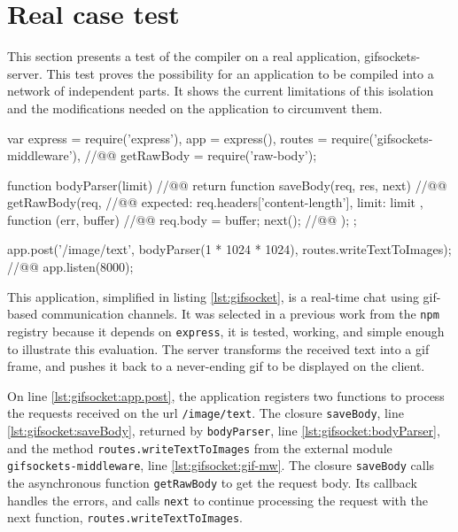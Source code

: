 \section{Real case test} \label{section:evaluation}

This section presents a test of the compiler on a real application, gifsockets-server.
This test proves the possibility for an application to be compiled into a network of independent parts.
It shows the current limitations of this isolation and the modifications needed on the application to circumvent them.

\begin{code}[js, caption={Simplified version of gifsockets-server},label={lst:gifsocket}]
var express = require('express'),
    app = express(),
    routes = require('gifsockets-middleware'), //@\label{lst:gifsocket:gif-mw}@
    getRawBody = require('raw-body');

function bodyParser(limit) { //@\label{lst:gifsocket:bodyParser}@
  return function saveBody(req, res, next) { //@\label{lst:gifsocket:saveBody}@
    getRawBody(req, { //@\label{lst:gifsocket:getRawBody}@
      expected: req.headers['content-length'],
      limit: limit
    }, function (err, buffer) { //@\label{lst:gifsocket:callback}@
      req.body = buffer;
      next(); //@\label{lst:gifsocket:next}@
    });
  };
}

app.post('/image/text', bodyParser(1 * 1024 * 1024), routes.writeTextToImages); //@\label{lst:gifsocket:app.post}@
app.listen(8000);
\end{code}

This application, simplified in listing \ref{lst:gifsocket}, is a real-time chat using gif-based communication channels.
It was selected in a previous work \cite{Brodu2015} from the \texttt{npm} registry because it depends on \texttt{express}, it is tested, working, and simple enough to illustrate this evaluation.
The server transforms the received text into a gif frame, and pushes it back to a never-ending gif to be displayed on the client.

On line \ref{lst:gifsocket:app.post}, the application registers two functions to process the requests received on the url \texttt{/image/text}.
The closure \texttt{saveBody}, line \ref{lst:gifsocket:saveBody}, returned by \texttt{bodyParser}, line \ref{lst:gifsocket:bodyParser}, and the method \texttt{routes.write\-Text\-To\-Images} from the external module \texttt{gifsockets-middleware}, line \ref{lst:gifsocket:gif-mw}.
The closure \texttt{saveBody} calls the asynchronous function \texttt{getRawBody} to get the request body.
Its callback handles the errors, and calls \texttt{next} to continue processing the request with the next function, \texttt{routes.write\-Text\-To\-Images}.


